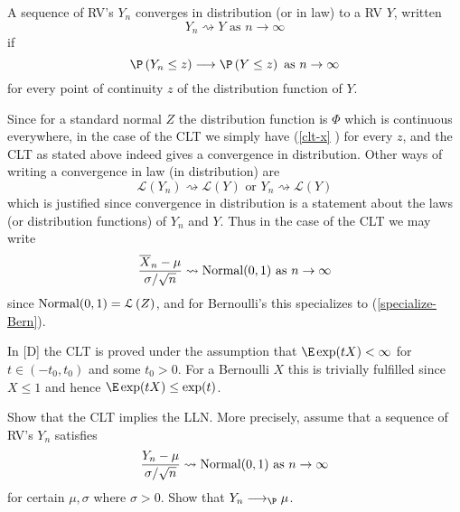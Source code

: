 \begin{definition}
\label{def-converg-in-law} A sequence of RV's $Y_{n}$ converges in
distribution (or in law) to a RV $Y$, written 
\begin{equation*}
Y_{n}\rightsquigarrow Y\text{ as }n\rightarrow \infty
\end{equation*}%
if 
\begin{equation}
\P \left( Y_{n}\leq z\right) \longrightarrow \P \left( Y\leq z\right) 
\text{ as }n\rightarrow \infty  \label{clt-x}
\end{equation}%
for every point of continuity $z$ of the distribution function of $Y$.
\end{definition}

Since for a standard normal $Z$ the distribution function is $\Phi $ which
is continuous everywhere, in the case of the CLT we simply have (\ref{clt-x}%
) for every $z$, and the CLT as stated above indeed gives a convergence in
distribution. Other ways of writing a convergence in law (in distribution)
are 
\begin{equation*}
\mathcal{L}\left( Y_{n}\right) \rightsquigarrow \mathcal{L}\left( Y\right) 
\text{ or }Y_{n}\rightsquigarrow \mathcal{L}\left( Y\right)
\end{equation*}%
which is justified since convergence in distribution is a statement about
the laws (or distribution functions) of $Y_{n}$ and $Y$. Thus in the case of
the CLT we may write 
\begin{equation*}
\frac{\overline{X}_{n}-\mu }{\sigma /\sqrt{n}}\rightsquigarrow \normal(0,1)\text{ as }%
n\rightarrow \infty
\end{equation*}%
since $\mbox{{\rm Normal}}(0,1)=\mathcal{L}\left( Z\right) $, and for Bernoulli's this
specializes to (\ref{specialize-Bern}).

In [D] the CLT is proved under the assumption that $\E\exp (tX)<\infty $ for $%
t\in \left( -t_{0},t_{0}\right) $ and some $t_{0}>0$. For a Bernoulli $X$
this is trivially fulfilled since $X\leq 1$ and hence $\E\exp (tX)\leq \exp
(t)$. \bigskip

\begin{Exercise}[title={CLT implies LLN},label={CLTImpliesLLN}]
Show that the CLT implies the LLN. More precisely, assume
that a sequence of RV's $Y_{n}$ satisfies 
\begin{equation*}
\frac{Y_{n}-\mu }{\sigma /\sqrt{n}}\rightsquigarrow \normal(0,1)\text{ as }%
n\rightarrow \infty
\end{equation*}%
for certain $\mu ,\sigma $ where $\sigma >0$. Show that $Y_{n}%
\longrightarrow_{\P}\mu $. \bigskip \bigskip
\end{Exercise}

